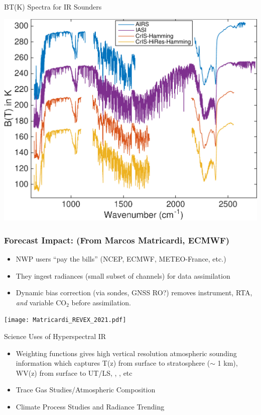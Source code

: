 \documentclass[10pt,t]{beamer}
\begin{document}
\begin{frame}{BT(K) Spectra for IR Sounders}
\begin{center}
\includegraphics[width=0.9\linewidth]{SunClimate2022/hyperall_hamming.pdf}
\end{center}
\end{frame}
\begin{frame}
  \frametitle{Forecast Impact: \small (From Marcos Matricardi, ECMWF)}
  \vspace{-0.1in}
  \begin{small}
  \begin{itemize}
  \item NWP users ``pay the bills'' (NCEP, ECMWF, METEO-France, etc.)
  \item They ingest radiances (small subset of channels) for data assimilation
  \item Dynamic bias correction (via sondes, GNSS RO?) removes instrument, RTA, \textit{and} variable CO$_2$ before assimilation.
\end{itemize}
  \end{small}
  \vspace{-0.45in}
  \texttt{[image: Matricardi\_REVEX\_2021.pdf]}
\end{frame}
\begin{frame}{Science Uses of Hyperspectral IR}
\begin{itemize}
  \item Weighting functions gives high vertical resolution atmospheric sounding information which captures 
         T(z) from surface to stratosphere ($\sim$ 1 km), WV(z) from surface to UT/LS, \ozone, \cd, \methane etc
  \item Trace Gas Studies/Atmospheric Composition
  \item Climate Process Studies and Radiance Trending
  \end{itemize}
\end{frame}
\end{document}
